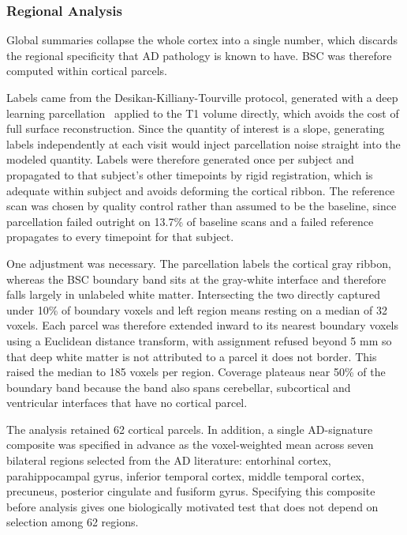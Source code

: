 \documentclass[blue]{ludusofficial}  %
\begin{document}
\subsubsection{Regional Analysis}

Global summaries collapse the whole cortex into a single number, which discards the regional specificity that AD pathology is known to have. BSC was therefore computed within cortical parcels.

Labels came from the Desikan-Killiany-Tourville protocol, generated with a deep learning parcellation~\cite{tustison2021antsxnet} applied to the T1 volume directly, which avoids the cost of full surface reconstruction. Since the quantity of interest is a slope, generating labels independently at each visit would inject parcellation noise straight into the modeled quantity. Labels were therefore generated once per subject and propagated to that subject's other timepoints by rigid registration, which is adequate within subject and avoids deforming the cortical ribbon. The reference scan was chosen by quality control rather than assumed to be the baseline, since parcellation failed outright on 13.7\% of baseline scans and a failed reference propagates to every timepoint for that subject.

One adjustment was necessary. The parcellation labels the cortical gray ribbon, whereas the BSC boundary band sits at the gray-white interface and therefore falls largely in unlabeled white matter. Intersecting the two directly captured under 10\% of boundary voxels and left region means resting on a median of 32 voxels. Each parcel was therefore extended inward to its nearest boundary voxels using a Euclidean distance transform, with assignment refused beyond 5 mm so that deep white matter is not attributed to a parcel it does not border. This raised the median to 185 voxels per region. Coverage plateaus near 50\% of the boundary band because the band also spans cerebellar, subcortical and ventricular interfaces that have no cortical parcel.

The analysis retained 62 cortical parcels. In addition, a single AD-signature composite was specified in advance as the voxel-weighted mean across seven bilateral regions selected from the AD literature: entorhinal cortex, parahippocampal gyrus, inferior temporal cortex, middle temporal cortex, precuneus, posterior cingulate and fusiform gyrus. Specifying this composite before analysis gives one biologically motivated test that does not depend on selection among 62 regions.
\end{document}
